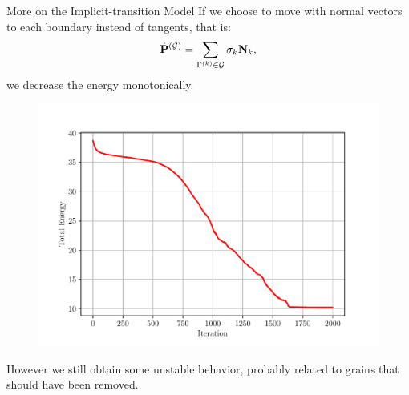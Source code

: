 \documentclass[usenames,dvipsnames]{beamer}
\begin{document}
\begin{frame}{More on the Implicit-transition Model}
If we choose to move with normal vectors to each boundary instead of tangents, that is:
%
\begin{equation*}
    \dot{\mathbf{P}}^{(\mathcal{G})} = \sum_{\Gamma^{(k)} \in \mathcal{G}} \sigma_k \mathbf{N}_k,
\end{equation*}
%
we decrease the energy monotonically.
\begin{figure}
    \centering
    \includegraphics[trim={0 1em 0 3em},clip=true,scale=0.4]{figures/3d_voronoi/3D_energy2.pdf}
\end{figure}
\vspace{-1em}
However we still obtain some unstable behavior, probably related to grains that should have been removed.
\end{frame}
\end{document}
